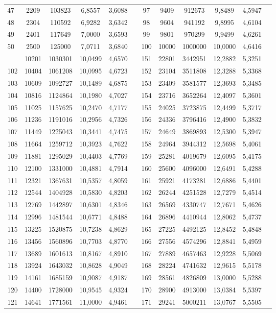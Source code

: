 \begin{longtable}{p{.17\linewidth}*{11}{S}}
47&2209&103823&6,8557&3,6088&&97&9409&912673&9,8489&4,5947\\
48&2304&110592&6,9282&3,6342&&98&9604&941192&9,8995&4,6104\\
49&2401&117649&7,0000&3,6593&&99&9801&970299&9,9499&4,6261\\
50&2500&125000&7,0711&3,6840&&100&10000&1000000&10,0000&4,6416\\
&10201&1030301&10,0499&4,6570&&151&22801&3442951&12,2882&5,3251\\
102&10404&1061208&10,0995&4,6723&&152&23104&3511808&12,3288&5,3368\\
103&10609&1092727&10,1489&4,6875&&153&23409&3581577&12,3693&5,3485\\
104&10816&1124864&10,1980&4,7027&&154&23716&3652264&12,4097&5,3601\\
105&11025&1157625&10,2470&4,7177&&155&24025&3723875&12,4499&5,3717\\
106&11236&1191016&10,2956&4,7326&&156&24336&3796416&12,4900&5,3832\\
107&11449&1225043&10,3441&4,7475&&157&24649&3869893&12,5300&5,3947\\
108&11664&1259712&10,3923&4,7622&&158&24964&3944312&12,5698&5,4061\\
109&11881&1295029&10,4403&4,7769&&159&25281&4019679&12,6095&5,4175\\
110&12100&1331000&10,4881&4,7914&&160&25600&4096000&12,6491&5,4288\\
111&12321&1367631&10,5357&4,8059&&161&25921&4173281&12,6886&5,4401\\
112&12544&1404928&10,5830&4,8203&&162&26244&4251528&12,7279&5,4514\\
113&12769&1442897&10,6301&4,8346&&163&26569&4330747&12,7671&5,4626\\
114&12996&1481544&10,6771&4,8488&&164&26896&4410944&12,8062&5,4737\\
115&13225&1520875&10,7238&4,8629&&165&27225&4492125&12,8452&5,4848\\
116&13456&1560896&10,7703&4,8770&&166&27556&4574296&12,8841&5,4959\\
117&13689&1601613&10,8167&4,8910&&167&27889&4657463&12,9228&5,5069\\
118&13924&1643032&10,8628&4,9049&&168&28224&4741632&12,9615&5,5178\\
119&14161&1685159&10,9087&4,9187&&169&28561&4826809&13,0000&5,5288\\
120&14400&1728000&10,9545&4,9324&&170&28900&4913000&13,0384&5,5397\\
121&14641&1771561&11,0000&4,9461&&171&29241&5000211&13,0767&5,5505\\

\end{longtable}
